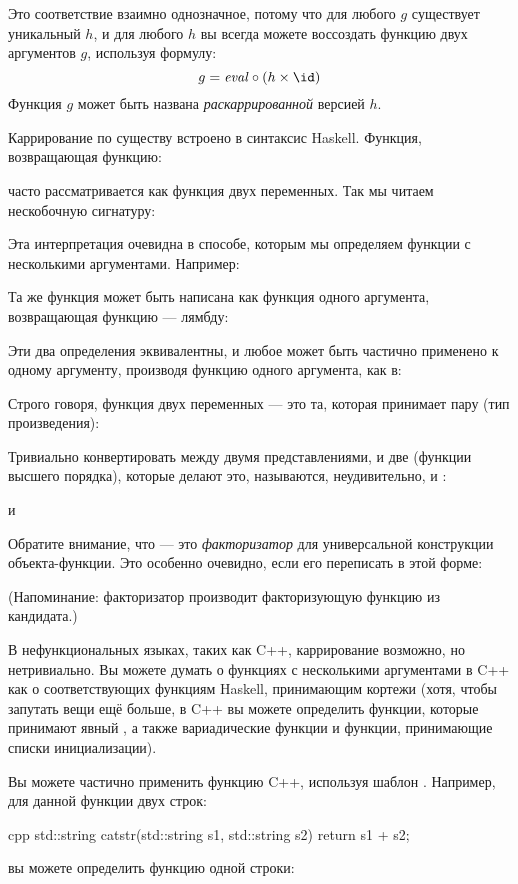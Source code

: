 Это соответствие взаимно однозначное, потому что для любого $g$ существует
уникальный $h$, и для любого $h$ вы всегда можете воссоздать
функцию двух аргументов $g$, используя формулу:
\[g = \mathit{eval} \circ (h \times \id)\]
Функция $g$ может быть названа \emph{раскаррированной} версией $h$.

Каррирование по существу встроено в синтаксис Haskell. Функция,
возвращающая функцию:

часто рассматривается как функция двух переменных. Так мы читаем
нескобочную сигнатуру:

Эта интерпретация очевидна в способе, которым мы определяем функции с несколькими аргументами.
Например:

Та же функция может быть написана как функция одного аргумента, возвращающая
функцию --- лямбду:

Эти два определения эквивалентны, и любое может быть частично
применено к одному аргументу, производя функцию одного аргумента, как в:

Строго говоря, функция двух переменных --- это та, которая принимает пару
(тип произведения):

Тривиально конвертировать между двумя представлениями, и две
(функции высшего порядка), которые делают это, называются, неудивительно,
 и :

и

Обратите внимание, что  --- это \emph{факторизатор} для универсальной
конструкции объекта-функции. Это особенно очевидно, если его
переписать в этой форме:

(Напоминание: факторизатор производит факторизующую функцию из
кандидата.)

В нефункциональных языках, таких как C++, каррирование возможно, но
нетривиально. Вы можете думать о функциях с несколькими аргументами в C++ как о
соответствующих функциям Haskell, принимающим кортежи (хотя, чтобы запутать
вещи ещё больше, в C++ вы можете определить функции, которые принимают явный
, а также вариадические функции и функции, принимающие
списки инициализации).

Вы можете частично применить функцию C++, используя шаблон
. Например, для данной функции двух строк:

\begin{snip}{cpp}
std::string catstr(std::string s1, std::string s2) {
    return s1 + s2;
}
\end{snip}
вы можете определить функцию одной строки:

